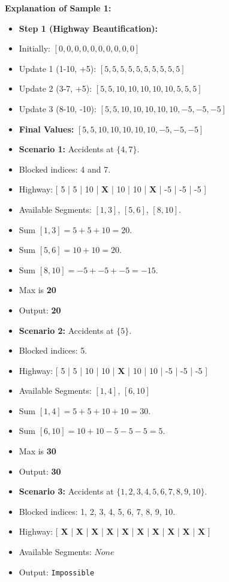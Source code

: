 \documentclass[11pt, a4paper]{article}
\begin{document}
\noindent \textbf{Explanation of Sample 1:}
\begin{itemize}
    \item \textbf{Step 1 (Highway Beautification):}
    \item Initially: $[0, 0, 0, 0, 0, 0, 0, 0, 0, 0]$
    \item Update 1 (1-10, +5): $[5, 5, 5, 5, 5, 5, 5, 5, 5, 5]$
    \item Update 2 (3-7, +5): $[5, 5, 10, 10, 10, 10, 10, 5, 5, 5]$
    \item Update 3 (8-10, -10): $[5, 5, 10, 10, 10, 10, 10, -5, -5, -5]$
    \item \textbf{Final Values:} $[5, 5, 10, 10, 10, 10, 10, -5, -5, -5]$\\
    
    \item \textbf{Scenario 1:} Accidents at $\{4, 7\}$.
    \item Blocked indices: 4 and 7.
    \item Highway: [ 5 | 5 | 10 | \textbf{X} | 10 | 10 | \textbf{X} | -5 | -5 | -5 ]

    \item Available Segments: $[1, 3]$, $[5, 6]$, $[8, 10]$.
    \item Sum $[1, 3] = 5+5+10 = 20$.
    \item Sum $[5, 6] = 10+10 = 20$.
    \item Sum $[8, 10] = -5 + -5 + -5 = -15$.
    \item Max is \textbf{20}
    \item Output: \textbf{20} \\

    \item \textbf{Scenario 2:} Accidents at $\{5\}$.
    \item Blocked indices: 5.    
    \item Highway: [ 5 | 5 | 10 | 10 | \textbf{X} | 10 | 10 | -5 | -5 | -5 ]
    \item Available Segments: $[1, 4]$, $[6, 10]$
    \item Sum $[1, 4] = 5+5+10+10 = 30$.
    \item Sum $[6, 10] = 10+10-5-5-5 = 5$.
    \item Max is \textbf{30}
    \item Output: \textbf{30} \\

    \item \textbf{Scenario 3:} Accidents at $\{1, 2, 3, 4, 5, 6, 7, 8, 9, 10\}$.
    \item Blocked indices: 1, 2, 3, 4, 5, 6, 7, 8, 9, 10.
    \item Highway: [ \textbf{X} | \textbf{X} | \textbf{X} | \textbf{X} | \textbf{X} | \textbf{X} | \textbf{X} | \textbf{X} | \textbf{X} | \textbf{X} ]
    \item Available Segments: $None$
    \item Output: \verb|Impossible|
\end{itemize}
\end{document}

